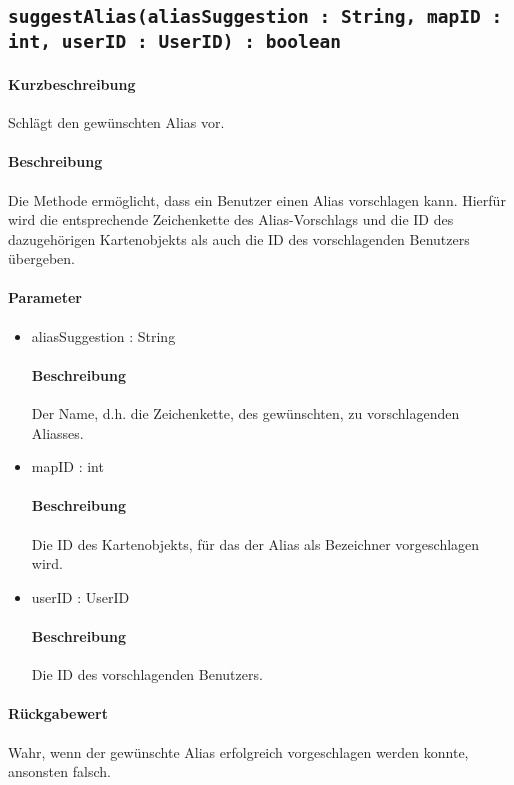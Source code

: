 \subsection{\texttt{suggestAlias(aliasSuggestion : String, mapID : int, userID : UserID) : boolean}}%
\paragraph*{Kurzbeschreibung}
Schlägt den gewünschten Alias vor.
\paragraph*{Beschreibung}
Die Methode ermöglicht, dass ein Benutzer einen Alias vorschlagen kann. 
Hierfür wird die entsprechende Zeichenkette des Alias-Vorschlags und die ID des dazugehörigen Kartenobjekts als auch die ID des vorschlagenden Benutzers übergeben.
\paragraph*{Parameter}
\begin{itemize}
	\item aliasSuggestion : String
		\paragraph*{Beschreibung}
		Der Name, d.h. die Zeichenkette, des gewünschten, zu vorschlagenden Aliasses.
	\item mapID : int
		\paragraph*{Beschreibung}
		Die ID des Kartenobjekts, für das der Alias als Bezeichner vorgeschlagen wird.
	\item userID : UserID
		\paragraph*{Beschreibung}
		Die ID des vorschlagenden Benutzers.
\end{itemize}
\paragraph*{Rückgabewert}
Wahr, wenn der gewünschte Alias erfolgreich vorgeschlagen werden konnte, ansonsten falsch.
